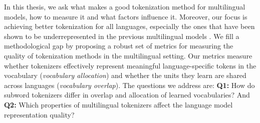 

In this thesis, we ask what makes a good tokenization method for multilingual models, how to measure it and what factors influence it. Moreover, our focus is achieving better tokenization for all languages, especially the ones that have been shown to be underrepresented in the previous multilingual models \cite{rust_how_2021}. We fill a methodological gap by proposing a robust set of metrics for measuring the quality of tokenization methods in the multilingual setting. Our metrics measure whether tokenizers effectively represent meaningful language-specific tokens in the vocabulary (\textit{vocabulary allocation}) and whether the units they learn are shared across languages (\textit{vocabulary overlap}). The questions we address are: \textbf{Q1:} How do subword tokenizers differ in overlap and allocation of learned vocabularies? And \textbf{Q2:} Which properties of multilingual tokenizers affect the language model representation quality?


